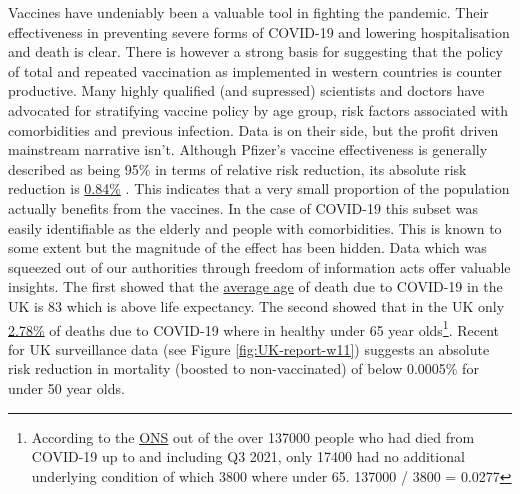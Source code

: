 \documentclass[11pt,a4paper,notitlepage]{report}
\begin{document}
Vaccines have undeniably been a valuable tool in fighting the pandemic. Their effectiveness in preventing severe forms of COVID-19 and lowering hospitalisation and death is clear. There is however a strong basis for suggesting that the policy of total and repeated vaccination as implemented in western countries is counter productive. Many highly qualified (and supressed) scientists and doctors have advocated for stratifying vaccine policy by age group, risk factors associated with comorbidities and previous infection. Data is on their side, but the profit driven mainstream narrative isn't. Although Pfizer's vaccine effectiveness is generally described as being 95\% in terms of relative risk reduction, its absolute risk reduction is \href{https://www.thelancet.com/journals/lanmic/article/PIIS2666-5247(21)00069-0/fulltext}{0.84\%} \cite{lancet20042021}. This indicates that a very small proportion of the population actually benefits from the vaccines. In the case of COVID-19 this subset was easily identifiable as the elderly and people with comorbidities. This is known to some extent but the magnitude of the effect has been hidden. Data which was squeezed out of our authorities through freedom of information acts offer valuable insights. The first showed that the \href{https://www.ons.gov.uk/aboutus/transparencyandgovernance/freedomofinformationfoi/averageageofthosewhohaddiedwithcovid19}{average age} of death due to COVID-19 in the UK is 83 \cite{freedomofinformationfoi11012021} which is above life expectancy. The second showed that in the UK only \href{https://www.ons.gov.uk/aboutus/transparencyandgovernance/freedomofinformationfoi/deathsfromcovid19withnootherunderlyingcauses}{2.78\%} \cite{freedomofinformationfoi16122021} of deaths due to COVID-19 where in healthy under 65 year olds\footnote{According to the \href{https://www.ons.gov.uk/aboutus/transparencyandgovernance/freedomofinformationfoi/deathsfromcovid19withnootherunderlyingcauses}{ONS} \cite{freedomofinformationfoi16122021} out of the over 137000 people who had died from COVID-19 up to and including Q3 2021, only 17400 had no additional underlying condition of which 3800 where under 65. 137000 / 3800 = 0.0277}. Recent  for UK surveillance data (see Figure \ref{fig:UK-report-w11}) suggests an absolute risk reduction in mortality (boosted to non-vaccinated) of below 0.0005\% for under 50 year olds.

\end{document}
